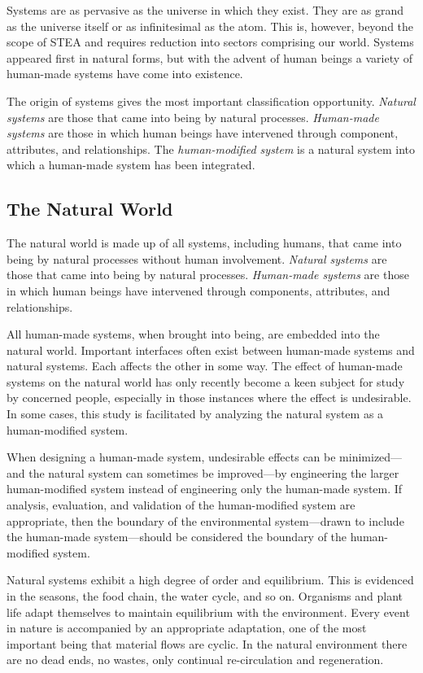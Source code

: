 Systems are as pervasive as the universe in which they exist.  They are as grand as the universe itself or as infinitesimal as the atom.  This is, however, beyond the scope of STEA and requires reduction into sectors comprising our world.  Systems appeared first in natural forms, but with the advent of human beings a variety of human-made systems have come into existence.

The origin of systems gives the most important classification opportunity.  \textit{Natural systems} are those that came into being by natural processes.  \textit{Human-made systems} are those in which human beings have intervened through component, attributes, and relationships.  The \textit{human-modified system} is a natural system into which a human-made system has been integrated.

\subsection{The Natural World}\label{sec:NaturalWorld}

The natural world is made up of all systems, including humans, that came into being by natural processes without human involvement. \textit{Natural systems} are those that came into being by natural processes. \textit{Human-made systems} are those in which human beings have intervened through components, attributes, and relationships. 

All human-made systems, when brought into being, are embedded into the natural world. Important interfaces often exist between human-made systems and natural systems. Each affects the other in some way. The effect of human-made systems on the natural world has only recently become a keen subject for study by concerned people, especially in those instances where the effect is undesirable. In some cases, this study is facilitated by analyzing the natural system as a human-modified system.

When designing a human-made system, undesirable effects can be minimized—and the natural system can sometimes be improved—by engineering the larger human-modified system instead of engineering only the human-made system. If analysis, evaluation, and validation of the human-modified system are appropriate, then the boundary of the environmental system—drawn to include the human-made system—should be considered the boundary of the human-modified system.

Natural systems exhibit a high degree of order and equilibrium. This is evidenced in the seasons, the food chain, the water cycle, and so on. Organisms and plant life adapt themselves to maintain equilibrium with the environment. Every event in nature is accompanied by an appropriate adaptation, one of the most important being that material flows are cyclic. In the natural environment there are no dead ends, no wastes, only continual re-circulation and regeneration.


